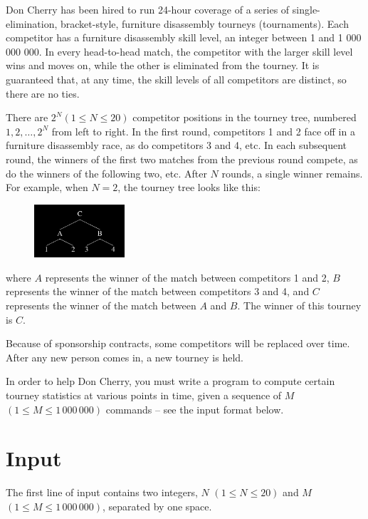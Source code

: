 Don Cherry has been hired to run 24-hour coverage of a series of single-elimination, bracket-style,
furniture disassembly tourneys (tournaments). Each competitor has a furniture disassembly skill
level, an integer between 1 and 1 000 000 000. In every head-to-head match, the competitor with
the larger skill level wins and moves on, while the other is eliminated from the tourney. It is
guaranteed that, at any time, the skill levels of all competitors are distinct, so there are no ties.

There are $2^N (1 \le N \le 20)$ competitor positions in the tourney tree, numbered $1, 2, \dots,
2^N$ from left to right. In the first round, competitors 1 and 2 face off in a furniture disassembly
race, as do competitors 3 and 4, etc. In each subsequent round, the winners of the first two matches
from the previous round compete, as do the winners of the following two, etc. After $N$ rounds, a
single winner remains. For example, when $N = 2$, the tourney tree looks like this:

\begin{figure}[h]
    \begin{center}
    \includegraphics[width=0.3\textwidth]{tree}
    \end{center}
\end{figure}
where $A$ represents the winner of the match between competitors 1 and 2, $B$ represents the winner of
the match between competitors 3 and 4, and $C$ represents the winner of the match between $A$ and
$B$. The winner of this tourney is $C$.

Because of sponsorship contracts, some competitors will be replaced over time. After any new person
comes in, a new tourney is held.

In order to help Don Cherry, you must write a program to compute certain tourney statistics at
various points in time, given a sequence of $M$ $(1 \le M \le 1\,000\,000)$ commands -- see the input
format below.

\section*{Input}
The first line of input contains two integers, $N$ $(1 \le N \le 20)$ and $M$ $(1 \le M \le
1\,000\,000)$, separated by one space.

